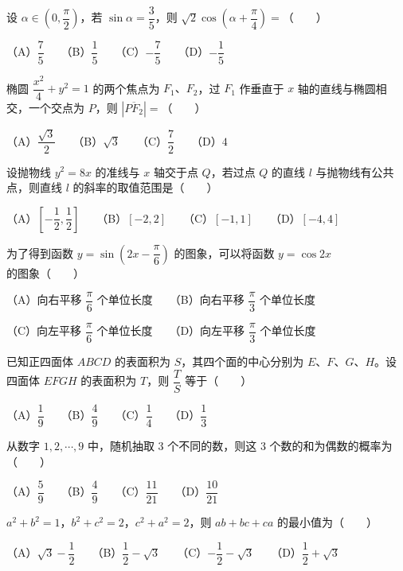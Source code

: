 \begin{question}
设 $\alpha\in\left(0,\dfrac\pi2\right)$，若 $\sin\alpha=\dfrac35$，则 $\sqrt2\cos\left(\alpha+\dfrac\pi4\right)=$\mbox{（　　）}

（A）$\dfrac75$　　（B）$\dfrac15$　　（C）$-\dfrac75$　　（D）$-\dfrac15$

\end{question}
\begin{question}
椭圆 $\dfrac{x^2}{4}+y^2=1$ 的两个焦点为 $F_1\text{、}F_2$，过 $F_1$ 作垂直于 $x$ 轴的直线与椭圆相交，一个交点为 $P$，则 $|\overline{PF_2}|=$\mbox{（　　）}

（A）$\dfrac{\sqrt3}{2}$　　（B）$\sqrt3$　　（C）$\dfrac72$　　（D）$4$

\end{question}
\begin{question}
设抛物线 $y^2=8x$ 的准线与 $x$ 轴交于点 $Q$，若过点 $Q$ 的直线 $l$ 与抛物线有公共点，则直线 $l$ 的斜率的取值范围是\mbox{（　　）}

（A）$\left[-\dfrac12,\dfrac12\right]$　　（B）$[-2,2]$　　（C）$[-1,1]$　　（D）$[-4,4]$

\end{question}
\begin{question}
为了得到函数 $y=\sin\left(2x-\dfrac\pi6\right)$ 的图象，可以将函数 $y=\cos2x$ 的图象\mbox{（　　）}

（A）向右平移 $\dfrac\pi6$ 个单位长度　　（B）向右平移 $\dfrac\pi3$ 个单位长度

（C）向左平移 $\dfrac\pi6$ 个单位长度　　（D）向左平移 $\dfrac\pi3$ 个单位长度

\end{question}
\begin{question}
已知正四面体 $ABCD$ 的表面积为 $S$，其四个面的中心分别为 $E\text{、}F\text{、}G\text{、}H$。设四面体 $EFGH$ 的表面积为 $T$，则 $\dfrac TS$ 等于\mbox{（　　）}

（A）$\dfrac19$　　（B）$\dfrac49$　　（C）$\dfrac14$　　（D）$\dfrac13$

\end{question}
\begin{question}
从数字 $1,2,\cdots,9$ 中，随机抽取 3 个不同的数，则这 3 个数的和为偶数的概率为\mbox{（　　）}

（A）$\dfrac59$　　（B）$\dfrac49$　　（C）$\dfrac{11}{21}$　　（D）$\dfrac{10}{21}$

\end{question}
\begin{question}
$a^2+b^2=1$，$b^2+c^2=2$，$c^2+a^2=2$，则 $ab+bc+ca$ 的最小值为\mbox{（　　）}

（A）$\sqrt3-\dfrac12$　　（B）$\dfrac12-\sqrt3$　　（C）$-\dfrac12-\sqrt3$　　（D）$\dfrac12+\sqrt3$

\end{question}

